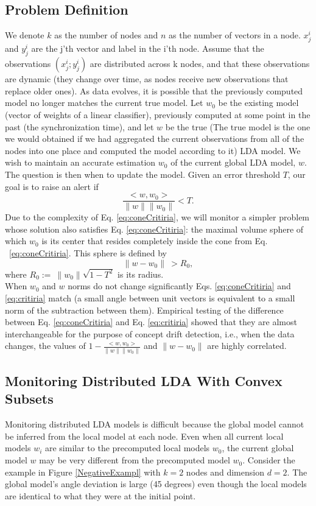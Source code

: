 \documentclass{sig-alternate-05-2015}
\begin{document}
\subsection{Problem Definition}
We denote $k$ as the number of nodes and
$n$ as the number of vectors in a node.
$x^i_j$ and $y^i_j$ are the j'th vector and label in the i'th node.
Assume that the observations ${(x^i_j; y^i_j)}$ are distributed across k nodes, 
and that these observations are dynamic (they change over time, as nodes receive 
new observations that replace older ones). 
As data evolves, it is possible that the previously computed model no longer 
matches the current true model. 
Let $w_0$ be the existing model (vector of weights of a linear classifier), 
previously computed at some point in the past (the synchronization time), 
and let $w$ be the true 
(The true model is the one we would obtained if we had aggregated the current observations 
from all of the nodes into one place and computed the model according to it) LDA
model.
We wish to maintain an accurate estimation $w_0$ of the current global LDA model, $w$. 
The question is then when to update the model.
Given an error threshold $T$, our goal is to raise an alert if
\begin{equation} \label{eq:coneCritiria}
\frac{<w,w_0>}{\parallel w \parallel \parallel w_0 \parallel}  < T.
\end{equation}
Due to the complexity of Eq. \ref{eq:coneCritiria},
we will monitor a simpler problem whose solution also satisfies
Eq. \ref{eq:coneCritiria}: the maximal volume sphere of which $w_0$ is its center
that resides completely inside the cone from Eq. ~\ref{eq:coneCritiria}.
This sphere is defined by
\begin{equation} \label{eq:critiria}
\parallel w-w_0 \parallel \  >  R_0,
\end{equation}
where $R_0 := \  \parallel w_0 \parallel \sqrt{1-T^2}$ is its radius.
\\When $w_0$ and $w$ norms do not change significantly Eqs. \ref{eq:coneCritiria} and
\ref{eq:critiria} match (a small angle between unit vectors is
equivalent to a small norm of the subtraction between them).
Empirical testing of the difference between Eq. \ref{eq:coneCritiria} and
Eq. \ref{eq:critiria} showed that they are almost interchangeable for the
purpose of concept drift detection, i.e., when the data changes, 
the values of $1-\frac{<w,w_0>}{\parallel w \parallel
\parallel w_0 \parallel}$ and $\parallel w-w_0 \parallel $ are highly  correlated.

\subsection{Monitoring Distributed LDA With Convex Subsets}
Monitoring distributed LDA models is difficult because the
global model cannot be inferred from the local model at each
node. Even when all current local models $w_i$ are similar to the precomputed
local models $w_0$, the current global model $w$ may
be very different from the precomputed model $w_0$. Consider
the example in Figure \ref{NegativeExampl} with $k = 2$ nodes and dimension $d =
2$. The global model's angle deviation is large (45 degrees) even
though the local models are identical to what they were at the initial
point.
\end{document}
